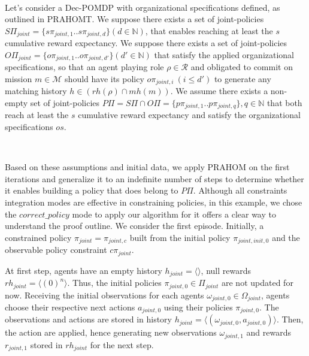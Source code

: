 \begin{proofoutline}
    \

    \noindent Let's consider a Dec-POMDP with organizational specifications defined, as outlined in PRAHOMT. We suppose there exists a set of joint-policies $S\Pi_{joint} = \{s\pi_{joint,1}.. s\pi_{joint,d}\} \allowbreak (d \in \mathbb{N})$, that enables reaching at least the $s$ cumulative reward expectancy.
    \noindent We suppose there exists a set of joint-policies $O\Pi_{joint} = \{o\pi_{joint,1}.. o\pi_{joint,d'}\} (d' \in \mathbb{N})$ that satisfy the applied organizational specifications, so that an agent playing role $\rho \in \mathcal{R}$ and obligated to commit on mission $m \in \mathcal{M}$ should have its policy $o\pi_{joint,i} \ (i \leq d')$ to generate any matching history $h \in (rh(\rho) \cap mh(m))$.
    \noindent We assume there exists a non-empty set of joint-policies $P\Pi = S\Pi \cap O\Pi \allowbreak = \{p\pi_{joint,1}..p\pi_{joint,q}\}, q \in \mathbb{N}$ that both reach at least the $s$ cumulative reward expectancy and satisfy the organizational specifications $os$.

    \

    \noindent Based on these assumptions and initial data, we apply PRAHOM on the first iterations and generalize it to an indefinite number of steps to determine whether it enables building a policy that does belong to $P\Pi$. Although all constraints integration modes are effective in constraining policies, in this example, we chose the $correct\_policy$ mode to apply our algorithm for it offers a clear way to understand the proof outline.
    We consider the first episode. Initially, a constrained policy $\pi_{joint} = \pi_{joint,c}$ built from the initial policy $\pi_{joint,init,0}$ and the observable policy constraint $c\pi_{joint}$.

    At first step, agents have an empty history $h_{joint} = \langle \rangle$, null rewards $rh_{joint} = \langle (0)^n \rangle $. Thus, the initial policies $\pi_{joint,0} \in \Pi_{joint}$ are not updated for now. Receiving the initial observations for each agents $\omega_{joint,0} \in \Omega_{joint}$, agents choose their respective next actions $a_{joint,0}$ using their policies $\allowbreak \pi_{joint,0}$. The observations and actions are stored in history $h_{joint} \allowbreak = \allowbreak \langle \allowbreak (\omega_{joint,0}, \allowbreak a_{joint,0}) \rangle$. Then, the action are applied, hence generating new observations $\omega_{joint,1}$ and rewards $r_{joint,1}$ stored in $rh_{joint}$ for the next step.


\end{proofoutline}
